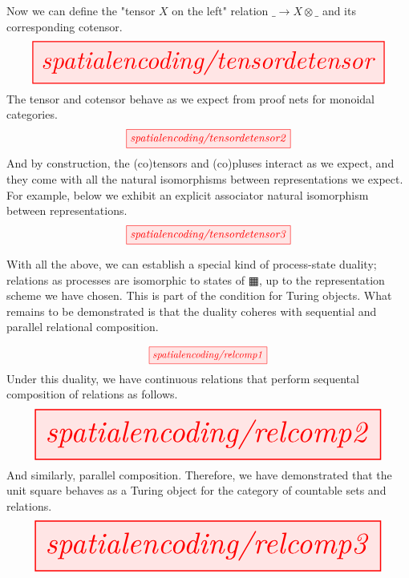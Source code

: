 \begin{myboxB}
Now we can define the "tensor $X$ on the left" relation $\_ \rightarrow X \otimes \_$ and its corresponding cotensor.
\[\resizebox{\textwidth}{!}{\tikzfig{spatialencoding/tensordetensor}}\]
The tensor and cotensor behave as we expect from proof nets for monoidal categories.
\[\scalebox{1}{\tikzfig{spatialencoding/tensordetensor2}}\]
And by construction, the (co)tensors and (co)pluses interact as we expect, and they come with all the natural isomorphisms between representations we expect. For example, below we exhibit an explicit associator natural isomorphism between representations.
\[\scalebox{1}{\tikzfig{spatialencoding/tensordetensor3}}\]
\end{myboxB}

\begin{myboxB}
\begin{construction}\label{cons:unitencoding}
With all the above, we can establish a special kind of process-state duality; relations as processes are isomorphic to states of $\squarehvfill$, up to the representation scheme we have chosen. This is part of the condition for Turing objects. What remains to be demonstrated is that the duality coheres with sequential and parallel relational composition.
\end{construction}
\[\scalebox{0.9}{\tikzfig{spatialencoding/relcomp1}}\]
Under this duality, we have continuous relations that perform sequental composition of relations as follows.
\[\resizebox{\textwidth}{!}{\tikzfig{spatialencoding/relcomp2}}\]
And similarly, parallel composition. Therefore, we have demonstrated that the unit square behaves as a Turing object for the category of countable sets and relations.
\[\resizebox{\textwidth}{!}{\tikzfig{spatialencoding/relcomp3}}\]
\end{myboxB}

